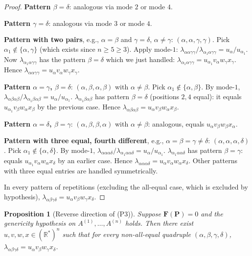 \documentclass[12pt]{article}
\newtheorem{proposition}[theorem]{Proposition}
\theoremstyle{definition}
\begin{document}
\begin{proof}
\textbf{Pattern $\beta=\delta$}: analogous via mode $2$ or mode $4$.

\textbf{Pattern $\gamma=\delta$}: analogous via mode $3$ or mode $4$.

\textbf{Pattern with two pairs}, e.g., $\alpha=\beta$ and $\gamma=\delta$, $\alpha\neq\gamma$:
$(\alpha,\alpha,\gamma,\gamma)$. Pick $\alpha_1\notin\{\alpha,\gamma\}$ (which exists since
$n\geq 5\geq 3$). Apply mode-$1$:
$\lambda_{\alpha\alpha\gamma\gamma}/\lambda_{\alpha_1\alpha\gamma\gamma}=u_\alpha/u_{\alpha_1}$.
Now $\lambda_{\alpha_1\alpha\gamma\gamma}$ has the pattern $\beta=\delta$ which we just
handled: $\lambda_{\alpha_1\alpha\gamma\gamma}=u_{\alpha_1}v_\alpha w_\gamma x_\gamma$.
Hence $\lambda_{\alpha\alpha\gamma\gamma}=u_\alpha v_\alpha w_\gamma x_\gamma$.

\textbf{Pattern $\alpha=\gamma$, $\beta=\delta$}: $(\alpha,\beta,\alpha,\beta)$ with
$\alpha\neq\beta$. Pick $\alpha_1\notin\{\alpha,\beta\}$. By mode-$1$,
$\lambda_{\alpha\beta\alpha\beta}/\lambda_{\alpha_1\beta\alpha\beta}=u_\alpha/u_{\alpha_1}$.
$\lambda_{\alpha_1\beta\alpha\beta}$ has pattern $\beta=\delta$ (positions $2,4$ equal): it
equals $u_{\alpha_1}v_\beta w_\alpha x_\beta$ by the previous case. Hence
$\lambda_{\alpha\beta\alpha\beta}=u_\alpha v_\beta w_\alpha x_\beta$.

\textbf{Pattern $\alpha=\delta$, $\beta=\gamma$}: $(\alpha,\beta,\beta,\alpha)$ with
$\alpha\neq\beta$: analogous, equals $u_\alpha v_\beta w_\beta x_\alpha$.

\textbf{Pattern with three equal, fourth different}, e.g., $\alpha=\beta=\gamma\neq\delta$:
$(\alpha,\alpha,\alpha,\delta)$. Pick $\alpha_1\notin\{\alpha,\delta\}$. By mode-$1$,
$\lambda_{\alpha\alpha\alpha\delta}/\lambda_{\alpha_1\alpha\alpha\delta}=u_\alpha/u_{\alpha_1}$.
$\lambda_{\alpha_1\alpha\alpha\delta}$ has pattern $\beta=\gamma$: equals
$u_{\alpha_1}v_\alpha w_\alpha x_\delta$ by an earlier case. Hence
$\lambda_{\alpha\alpha\alpha\delta}=u_\alpha v_\alpha w_\alpha x_\delta$. Other patterns
with three equal entries are handled symmetrically.

In every pattern of repetitions (excluding the all-equal case, which is excluded by
hypothesis), $\lambda_{\alpha\beta\gamma\delta}=u_\alpha v_\beta w_\gamma x_\delta$.
\end{proof}

\begin{proposition}[Reverse direction of (P3)]\label{prop:rev}
Suppose $\mathbf{F}(\mathbf{P})=0$ and the genericity hypothesis on $A^{(1)},\ldots,A^{(n)}$
holds. Then there exist $u,v,w,x\in(\mathbb{R}^*)^n$ such that for every non-all-equal
quadruple $(\alpha,\beta,\gamma,\delta)$,
$\lambda_{\alpha\beta\gamma\delta}=u_\alpha v_\beta w_\gamma x_\delta$.
\end{proposition}
\end{document}
